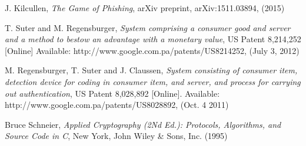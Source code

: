 \documentclass[smallextended]{svjour3}       	\smartqed  \usepackage{graphicx}
\begin{document}
\newpage
\begin{thebibliography}{}

J. Kilcullen, \emph{The Game of Phishing}, arXiv preprint, arXiv:1511.03894, (2015)

T. Suter and M. Regensburger, \emph{System comprising a consumer good and server and a method to bestow an advantage with a monetary value}, US Patent 8,214,252 [Online] Available: http://www.google.com.pa/patents/US8214252, (July 3, 2012)

M. Regensburger, T. Suter and J. Claussen, \emph{System consisting of consumer item, detection device for coding in consumer item, and server, and process for carrying out authentication}, US Patent 8,028,892 [Online]. Available: http://www.google.com.pa/patents/US8028892, (Oct. 4 2011)

Bruce Schneier, \emph{Applied Cryptography (2Nd Ed.): Protocols, Algorithms, and Source Code in C}, New York, John Wiley \& Sons, Inc. (1995)



\end{thebibliography}
\end{document}
